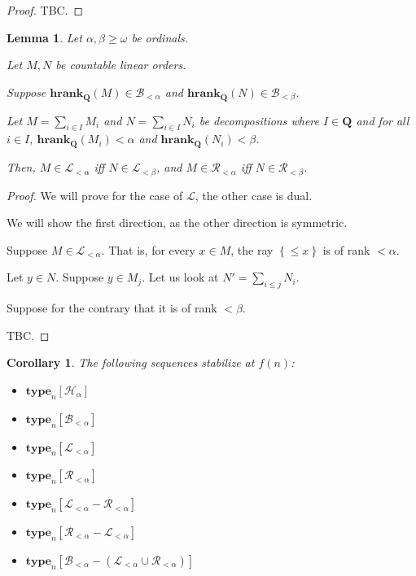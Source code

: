 \documentclass{article}
\newtheorem{corollary}{Corollary}
\newtheorem{lemma}{Lemma}
\newcommand{\brackets}[1]{\left[ {#1} \right]}
\newcommand{\braces}[1]{\left\{ {#1} \right\}}
\newcommand{\setcomp}[1]{\braces{#1}}
\newcommand{\hrank}[1]{\mathbf{hrank}_{\qq}\left( #1 \right)}
\newcommand{\qq}{\mathbf{Q}}
\newcommand{\type}[2]{\mathbf{type}_{#1} \brackets{#2}}
\begin{document}
\begin{proof}
  TBC.
\end{proof}

\begin{lemma}
  Let $\alpha, \beta \ge \omega$ be ordinals.

  Let $M, N$ be countable linear orders.

  Suppose $\hrank{M} \in \mathcal{B}_{< \alpha}$ and $\hrank{N} \in \mathcal{B}_{< \beta}$.

  Let $M = \sum_{i \in I} M_i$ and $N = \sum_{i \in I} N_i$ be decompositions
  where $I \in \qq$ and for all $i \in I$, $\hrank{M_i} < \alpha$
  and $\hrank{N_i} < \beta$.

  Then, $M \in \mathcal{L}_{< \alpha}$ iff $N \in \mathcal{L}_{< \beta}$,
  and $M \in \mathcal{R}_{< \alpha}$ iff $N \in \mathcal{R}_{< \beta}$.
\end{lemma}

\begin{proof}
  We will prove for the case of $\mathcal{L}$, the other case is dual.

  We will show the first direction, as the other direction is symmetric.

  Suppose $M \in \mathcal{L}_{< \alpha}$.
  That is, for every $x \in M$, the ray $\setcomp{\le x}$ is of rank $< \alpha$.

  Let $y \in N$. Suppose $y \in M_j$. Let us look at
  $N' = \sum_{i \le j} N_i$.

  Suppose for the contrary that it is of rank $< \beta$.

  TBC.
\end{proof}

\begin{corollary}
  The following sequences stabilize at $f(n)$:

  \begin{itemize}
    \item $\type{n}{\mathcal{H}_{\alpha}}$
    \item $\type{n}{\mathcal{B}_{< \alpha}}$
    \item $\type{n}{\mathcal{L}_{< \alpha}}$
    \item $\type{n}{\mathcal{R}_{< \alpha}}$
    \item $\type{n}{\mathcal{L}_{< \alpha} - \mathcal{R}_{< \alpha}}$
    \item $\type{n}{\mathcal{R}_{< \alpha} - \mathcal{L}_{< \alpha}}$
    \item $\type{n}{\mathcal{B}_{< \alpha} - (\mathcal{L}_{< \alpha} \cup \mathcal{R}_{< \alpha})}$
  \end{itemize}
\end{corollary}
\end{document}
